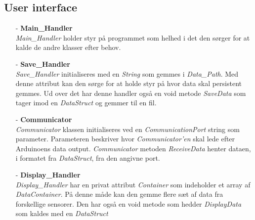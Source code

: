 \subsection{User interface}
\begin{itemize}
    \item [-] \textbf{Main\_Handler} \hfill \\
    \textit{Main\_Handler} holder styr på programmet som helhed i det den sørger for at kalde de andre klasser efter behov.
    
    \item [-] \textbf{Save\_Handler} \hfill \\
    \textit{Save\_Handler} initialiseres med en \textit{String} som gemmes i \textit{Data\_Path}. Med denne attribut kan den sørge for at holde styr på hvor data skal persistent gemmes. Ud over det har denne handler også en void metode \textit{SaveData} som tager imod en \textit{DataStruct} og gemmer til en fil. 
    
    \item [-] \textbf{Communicator} \hfill \\
    \textit{Communicator} klassen initialiseres ved en \textit{CommunicationPort} string som parameter. Parameteren beskriver hvor \textit{Communicator'en} skal lede efter Arduinoens data output. \textit{Communicator} metoden \textit{ReceiveData} henter dataen, i formatet fra \textit{DataStruct}, fra den angivne port.
    
    \item [-] \textbf{Display\_Handler} \hfill \\
    \textit{Display\_Handler} har en privat attribut \textit{Container} som indeholder et array af \textit{DataContainer}. På denne måde kan den gemme flere sæt af data fra forskellige sensorer. Den har også en void metode som hedder \textit{DisplayData} som kaldes med en \textit{DataStruct}
\end{itemize}

